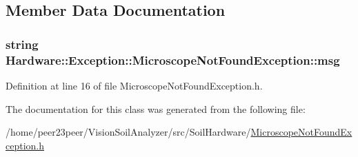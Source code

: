 \subsection{Member Data Documentation}
\hypertarget{class_hardware_1_1_exception_1_1_microscope_not_found_exception_ae8ac712f31fe28bba8946710521e8926}{}
\subsubsection[{msg}]{\setlength{\rightskip}{0pt plus 5cm}string Hardware\+::\+Exception\+::\+Microscope\+Not\+Found\+Exception\+::msg\hspace{0.3cm}{\ttfamily [private]}}\label{class_hardware_1_1_exception_1_1_microscope_not_found_exception_ae8ac712f31fe28bba8946710521e8926}


Definition at line 16 of file Microscope\+Not\+Found\+Exception.\+h.



The documentation for this class was generated from the following file\+:\begin{DoxyCompactItemize}
\item 
/home/peer23peer/\+Vision\+Soil\+Analyzer/src/\+Soil\+Hardware/\hyperlink{_microscope_not_found_exception_8h}{Microscope\+Not\+Found\+Exception.\+h}\end{DoxyCompactItemize}
